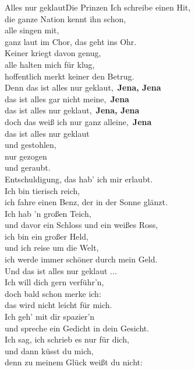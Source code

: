 
\begin{lied}{Alles nur geklaut}{Die Prinzen}
Ich schreibe einen Hit,\\
die ganze Nation kennt ihn schon,\\
alle singen mit,\\
ganz laut im Chor, das geht ins Ohr.\\
Keiner kriegt davon genug,\\
alle halten mich für klug,\\
hoffentlich merkt keiner den Betrug.\\

Denn das ist alles nur geklaut, \,\textbf{Jena, Jena}\\
das ist alles gar nicht meine, \,\textbf{Jena}\\
das ist alles nur geklaut, \,\textbf{Jena, Jena}\\
doch das weiß ich nur ganz alleine, \,\textbf{Jena}\\
das ist alles nur geklaut\\
und gestohlen,\\
nur gezogen\\
und geraubt.\\
Entschuldigung, das hab' ich mir erlaubt.\\

Ich bin tierisch reich,\\
ich fahre einen Benz, der in der Sonne glänzt.\\
Ich hab 'n großen Teich,\\
und davor ein Schloss und ein weißes Ross,\\
ich bin ein großer Held,\\
und ich reise um die Welt,\\
ich werde immer schöner durch mein Geld.\\

Und das ist alles nur geklaut ...\\

Ich will dich gern verführ'n,\\
doch bald schon merke ich:\\
das wird nicht leicht für mich.\\
Ich geh' mit dir spazier'n\\
und spreche ein Gedicht in dein Gesicht.\\
Ich sag, ich schrieb es nur für dich,\\
und dann küsst du mich,\\
denn zu meinem Glück weißt du nicht:\\


\end{lied}
